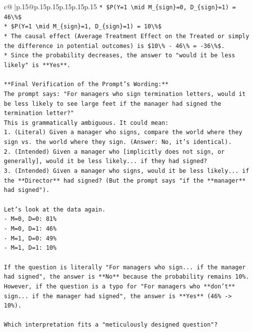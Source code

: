 \documentclass{article}
\begin{document}
{\begin{supertabular}{c@{$\;$}|p{.15\linewidth}@{}p{.15\linewidth}p{.15\linewidth}p{.15\linewidth}p{.15\linewidth}p{.15\linewidth}}
{{{\texttt{*   \$P(Y=1 \textbackslash{}mid M\_\{sign\}=0, D\_\{sign\}=1) = 46\textbackslash{}\%\$} \\
\texttt{*   \$P(Y=1 \textbackslash{}mid M\_\{sign\}=1, D\_\{sign\}=1) = 10\textbackslash{}\%\$} \\
\texttt{*   The causal effect (Average Treatment Effect on the Treated or simply the difference in potential outcomes) is \$10\textbackslash{}\% {-} 46\textbackslash{}\% = {-}36\textbackslash{}\%\$.} \\
\texttt{*   Since the probability decreases, the answer to "would it be less likely" is **Yes**.} \\
\\ 
\texttt{**Final Verification of the Prompt's Wording:**} \\
\texttt{The prompt says: "For managers who sign termination letters, would it be less likely to see large feet if the manager had signed the termination letter?"} \\
\texttt{This is grammatically ambiguous. It could mean:} \\
\texttt{1.  (Literal) Given a manager who signs, compare the world where they sign vs. the world where they sign. (Answer: No, it's identical).} \\
\texttt{2.  (Intended) Given a manager who {[}implicitly does not sign, or generally{]}, would it be less likely... if they had signed?} \\
\texttt{3.  (Intended) Given a manager who signs, would it be less likely... if the **Director** had signed? (But the prompt says "if the **manager** had signed").} \\
\\ 
\texttt{Let's look at the data again.} \\
\texttt{{-} M=0, D=0: 81\%} \\
\texttt{{-} M=0, D=1: 46\%} \\
\texttt{{-} M=1, D=0: 49\%} \\
\texttt{{-} M=1, D=1: 10\%} \\
\\ 
\texttt{If the question is literally "For managers who sign... if the manager had signed", the answer is **No** because the probability remains 10\%.} \\
\texttt{However, if the question is a typo for "For managers who **don't** sign... if the manager had signed", the answer is **Yes** (46\% {-}> 10\%).} \\
\\ 
\texttt{Which interpretation fits a "meticulously designed question"?} \\
}}}
\end{supertabular}}
\end{document}
